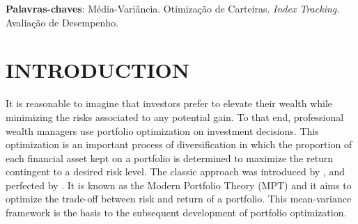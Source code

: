 \documentclass[12pt,oneside,a4paper]{memoir}
\begin{document}
\noindent 
\textbf{Palavras-chaves}: Média-Variância. Otimização de Carteiras. \textit{Index Tracking.} Avaliação de Desempenho.


\cleardoublepage
\listoffigures*



\cleardoublepage
\listoftables*


\cleardoublepage
\tableofcontents*
\cleardoublepage

\textual

\setcounter{page}{10} 

\chapter{INTRODUCTION}

It is reasonable to imagine that investors prefer to elevate their wealth while minimizing the risks associated to any potential gain.
To that end, professional wealth managers use portfolio optimization on investment decisions.
This optimization is an important process of diversification in which the proportion of each financial asset kept on a portfolio is determined to maximize the return contingent to a desired risk level.
The classic approach was introduced by , and perfected by .
It is known as the Modern Portfolio Theory (MPT) and it aims to optimize the trade-off between risk and return of a portfolio.
This mean-variance framework is the basis to the subsequent development of portfolio optimization.
\end{document}
